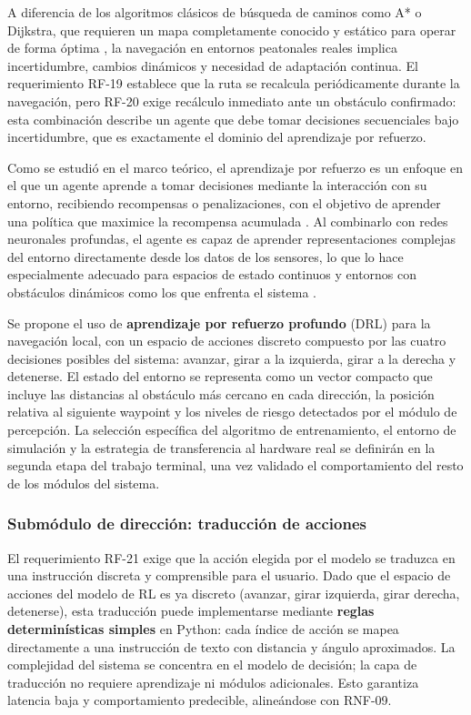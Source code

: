 A diferencia de los algoritmos clásicos de búsqueda de caminos como A* o Dijkstra,
que requieren un mapa completamente conocido y estático para operar de forma óptima
\cite{hart1968astar, dijkstra1959}, la navegación en entornos peatonales reales implica
incertidumbre, cambios dinámicos y necesidad de adaptación continua. El requerimiento
RF-19 establece que la ruta se recalcula periódicamente durante la navegación, pero
RF-20 exige recálculo inmediato ante un obstáculo confirmado: esta combinación describe
un agente que debe tomar decisiones secuenciales bajo incertidumbre, que es exactamente
el dominio del aprendizaje por refuerzo.

Como se estudió en el marco teórico, el aprendizaje por refuerzo es un enfoque en el
que un agente aprende a tomar decisiones mediante la interacción con su entorno,
recibiendo recompensas o penalizaciones, con el objetivo de aprender una política que
maximice la recompensa acumulada \cite{ibm2025_mltypes}. Al combinarlo con redes
neuronales profundas, el agente es capaz de aprender representaciones complejas del
entorno directamente desde los datos de los sensores, lo que lo hace especialmente
adecuado para espacios de estado continuos y entornos con obstáculos dinámicos como
los que enfrenta el sistema \cite{ibm2025_mltypes}.

Se propone el uso de \textbf{aprendizaje por refuerzo profundo} (DRL) para la
navegación local, con un espacio de acciones discreto compuesto por las cuatro
decisiones posibles del sistema: avanzar, girar a la izquierda, girar a la derecha
y detenerse. El estado del entorno se representa como un vector compacto que incluye
las distancias al obstáculo más cercano en cada dirección, la posición relativa al
siguiente waypoint y los niveles de riesgo detectados por el módulo de percepción.
La selección específica del algoritmo de entrenamiento, el entorno de simulación y
la estrategia de transferencia al hardware real se definirán en la segunda etapa del
trabajo terminal, una vez validado el comportamiento del resto de los módulos del
sistema.

\subsubsection{Submódulo de dirección: traducción de acciones}

El requerimiento RF-21 exige que la acción elegida por el modelo se traduzca en una
instrucción discreta y comprensible para el usuario. Dado que el espacio de acciones
del modelo de RL es ya discreto (avanzar, girar izquierda, girar derecha, detenerse),
esta traducción puede implementarse mediante \textbf{reglas determinísticas simples}
en Python: cada índice de acción se mapea directamente a una instrucción de texto con
distancia y ángulo aproximados. La complejidad del sistema se concentra en el modelo de
decisión; la capa de traducción no requiere aprendizaje ni módulos adicionales. Esto
garantiza latencia baja y comportamiento predecible, alineándose con RNF-09.

